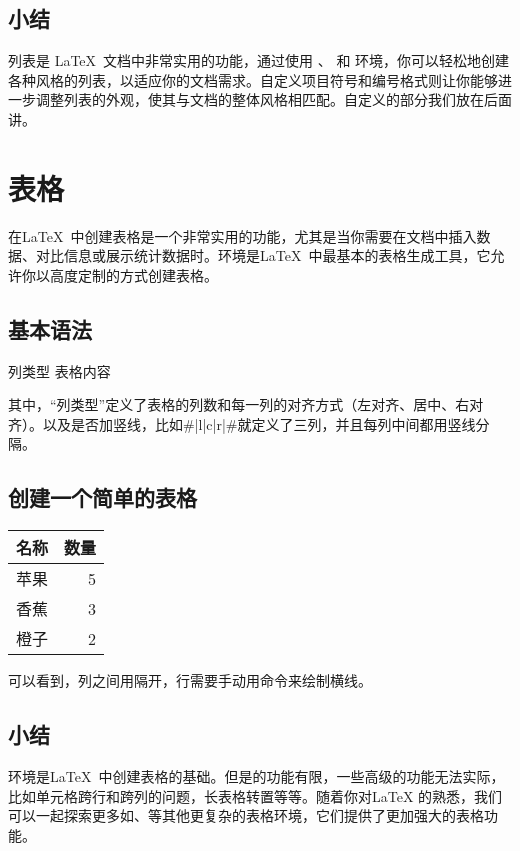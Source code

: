 {{{\subsection{小结}
列表是 \LaTeX\ 文档中非常实用的功能，通过使用 、 和 
环境，你可以轻松地创建各种风格的列表，以适应你的文档需求。自定义项目符号和编号格式则让你能够进一步调整列表的外观，使其与文档的整体风格相匹配。自定义的部分我们放在后面讲。

\section{表格}
在\LaTeX\
中创建表格是一个非常实用的功能，尤其是当你需要在文档中插入数据、对比信息或展示统计数据时。环境是\LaTeX\ 中最基本的表格生成工具，它允许你以高度定制的方式创建表格。

\subsection{基本语法}

\begin{texlst}
\begin{tabular}{列类型}
    表格内容
\end{tabular}
\end{texlst}

其中，\enquote{列类型}定义了表格的列数和每一列的对齐方式（左对齐、居中、右对齐）。以及是否加竖线\texinline{|}，比如\texinline#{|l|c|r|}#就定义了三列，并且每列中间都用竖线分隔。

\subsection{创建一个简单的表格}
\begin{texlst}
\begin{tabular}{|c|r|}
    \hline
    名称 & 数量 \\ \hline
    苹果 & 5 \\
    香蕉 & 3 \\
    橙子 & 2 \\
    \hline
\end{tabular}
\end{texlst}
可以看到，列之间用\texinline{&}隔开，行需要手动用\texinline{\hline}命令来绘制横线。

\subsection{小结}
环境是\LaTeX\
中创建表格的基础。但是的功能有限，一些高级的功能无法实际，比如单元格跨行和跨列的问题，长表格转置等等。随着你对\LaTeX
的熟悉，我们可以一起探索更多如、等其他更复杂的表格环境，它们提供了更加强大的表格功能。

}}}
